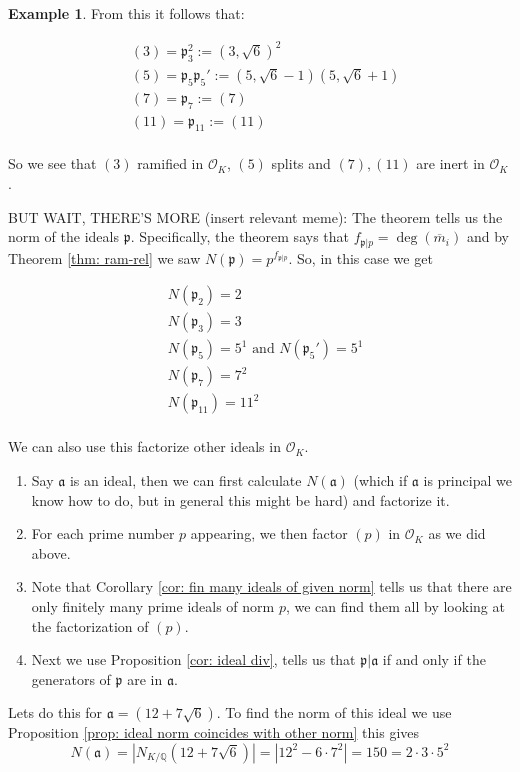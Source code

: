 \documentclass[11pt,a4paper]{report}
\theoremstyle{plain}
\theoremstyle{definition}
\newtheorem{exmp}[subsection]{Example}
\theoremstyle{definition}
\def\QQ{\mathbb{Q}}
\def\gothp{\mathfrak{p}}
\def \OO {\mathcal{O}}
\def \ov{\overline}
\def\gotha{\mathfrak{a}}
\begin{document}
\begin{exmp}
		From this it follows that: 
		
		\begin{align*}
			&(3)=\gothp_3^2:=(3,\sqrt{6})^2 \\
			&(5)=\gothp_5\gothp_5':=(5,\sqrt{6}-1)(5,\sqrt{6}+1)\\
			&(7)=\gothp_7:=(7)\\
			&(11)=\gothp_{11}:= (11)\\
		\end{align*}
		
		So we see that $(3)$ ramified in $\OO_K$, $(5)$ splits and $(7),(11)$ are inert in $\OO_K$.	
		
		BUT WAIT, THERE'S MORE (insert relevant meme): The theorem tells us the norm of the ideals $\gothp$. Specifically, the theorem says that $f_{\gothp|p}=\deg(\ov{m}_i)$ and by Theorem \ref{thm: ram-rel} we saw $N(\gothp)=p^{f_{\gothp|p}}$.  So, in this case we get
		
		\begin{align*}
			&N(\gothp_2)=2 \\
			&N(\gothp_3)=3 \\
			&N(\gothp_5)=5^1 \text{ and } N(\gothp_5')=5^1 \\ 
			&N(\gothp_7)=7^2 \\
			&N(\gothp_{11})=11^2 \\
		\end{align*}	
		
		We can also use this factorize other ideals in $\OO_K$.
		
		\begin{enumerate}
			\item  Say $\gotha$ is an ideal, then we can first calculate $N(\gotha)$ (which if $\gotha$ is principal we know how to do, but in general this might be hard) and factorize it.
			\item For each prime number $p$ appearing, we then factor $(p)$ in $\OO_K$ as we did above.
			\item  Note that Corollary \ref{cor: fin many ideals of given norm} tells us that there are only finitely many prime ideals of norm $p$, we can find them all by looking at the factorization of $(p)$.
			\item Next we use Proposition \ref{cor: ideal div}, tells us that $\gothp | \gotha$ if and only if the generators of $\gothp$ are in $\gotha$.
		\end{enumerate}
		
		Lets do this for $\gotha=(12+7\sqrt{6})$. To find the norm of this ideal we use Proposition \ref{prop: ideal norm coincides with other norm} this gives \[N(\gotha)=|N_{K/\QQ}(12+7\sqrt{6})|=|12^2-6\cdot7^2|=150=2\cdot 3 \cdot 5^2\]    
		

\end{exmp}
\end{document}
